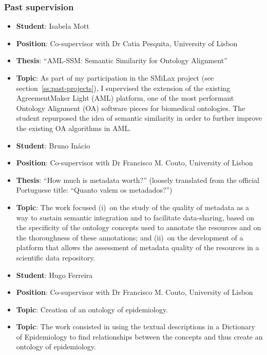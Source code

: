\subsubsection{Past supervision}

\begin{itemize}
    \item \textbf{Student}: Isabela Mott
    \item \textbf{Position}: Co-supervisor with Dr Catia Pesquita, University of Lisbon
    \item \textbf{Thesis}: ``AML-SSM: Semantic Similarity for Ontology Alignment''
    \item \textbf{Topic}: As part of my participation in the SMiLax project (see section~\ref{ss:past-projects}), I supervised the extension of the existing AgreementMaker Light (AML) platform, one of the most performant Ontology Alignment (OA) software pieces for biomedical ontologies. The student  repurposed the idea of semantic similarity in order to further improve the existing OA algorithms in AML.
\end{itemize}


\begin{itemize}
    \item \textbf{Student}: Bruno Inácio
    \item \textbf{Position}: Co-supervisor with Dr Francisco M. Couto, University of Lisbon
    \item \textbf{Thesis}: ``How much is metadata worth?'' (loosely translated from the official Portuguese title: ``Quanto valem os metadados?'')
    \item \textbf{Topic}: The work focused (i)~on the study of the quality of metadata as a way to sustain semantic integration and to facilitate data-sharing, based on the specificity of the ontology concepts used to annotate the resources and on the thoroughness of these annotations; and (ii)~on the development of a platform that allows the assessment of metadata quality of the resources in a scientific data repository.
\end{itemize}


\begin{itemize}
    \item \textbf{Student}: Hugo Ferreira
    \item \textbf{Position}: Co-supervisor with Dr Francisco M. Couto, University of Lisbon
    \item \textbf{Topic}: Creation of an ontology of epidemiology.
    \item \textbf{Topic}: The work consisted in using the textual descriptions in a Dictionary of Epidemiology to find relationships between the concepts and thus create an ontology of epidemiology.
\end{itemize}


